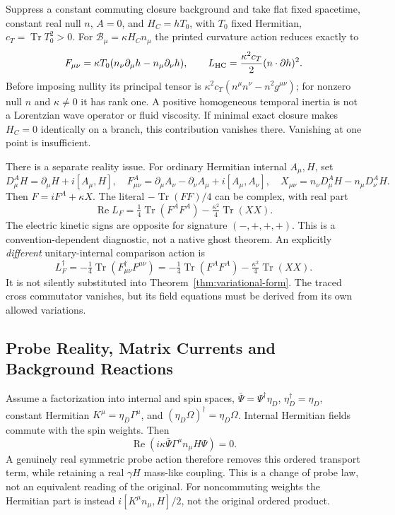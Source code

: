 Suppress a constant commuting closure background and take flat fixed
spacetime, constant real null $n$, $A=0$, and $H_C=hT_0$, with
$T_0$ fixed Hermitian, $c_T=\operatorname{Tr}T_0^2>0$.
For $\mathcal B_\mu=\kappa H_Cn_\mu$ the printed curvature
action reduces exactly to
\[
 F_{\mu\nu}=\kappa T_0(n_\nu\partial_\mu h-n_\mu\partial_\nu h),
 \qquad
 L_{\rm HC}=\frac{\kappa^2c_T}{2}(n\mathbin{\cdot}\partial h)^2.
\]
Before imposing nullity its principal tensor is
$\kappa^2c_T(n^\mu n^\nu-n^2g^{\mu\nu})$; for nonzero null
$n$ and $\kappa\ne0$ it has rank one. A positive homogeneous
temporal inertia is not a Lorentzian wave operator or fluid viscosity.
If minimal exact closure makes $H_C=0$ identically on a branch, this
contribution vanishes there. Vanishing at one point is insufficient.

There is a separate reality issue. For ordinary Hermitian internal
$A_\mu,H$, set
\[
 D_\mu^AH=\partial_\mu H+i[A_\mu,H],\quad
 F^A_{\mu\nu}=\partial_\mu A_\nu-\partial_\nu A_\mu+i[A_\mu,A_\nu],
 \quad X_{\mu\nu}=n_\nu D_\mu^AH-n_\mu D_\nu^AH.
\]
Then $F=iF^A+\kappa X$. The literal $-\operatorname{Tr}(FF)/4$
can be complex, with real part
\[
 \operatorname{Re}L_F=\tfrac14\operatorname{Tr}(F^AF^A)
                         -\tfrac{\kappa^2}4\operatorname{Tr}(XX).
\]
The electric kinetic signs are opposite for signature $(-,+,+,+)$.
This is a convention-dependent diagnostic, not a native ghost theorem.
An explicitly \emph{different} unitary-internal comparison action is
\[
 L_F^\dagger=-\tfrac14\operatorname{Tr}(F_{\mu\nu}^\dagger F^{\mu\nu})
 =-\tfrac14\operatorname{Tr}(F^AF^A)
  -\tfrac{\kappa^2}4\operatorname{Tr}(XX).
\]
It is not silently substituted into Theorem~\ref{thm:variational-form}.
The traced cross commutator vanishes, but its field equations must be
derived from its own allowed variations.

\subsection{Probe Reality, Matrix Currents and Background Reactions}

Assume a factorization into internal and spin spaces,
$\bar\Psi=\Psi^\dagger\eta_D$, $\eta_D^\dagger=\eta_D$, constant Hermitian
$K^\mu=\eta_D\Gamma^\mu$, and
$(\eta_D\Omega)^\dagger=\eta_D\Omega$. Internal Hermitian fields
commute with the spin weights. Then
\[
 \operatorname{Re}(i\kappa\bar\Psi\Gamma^\mu n_\mu H\Psi)=0.
\]
A genuinely real symmetric probe action therefore removes this ordered
transport term, while retaining a real $\gamma H$ mass-like coupling.
This is a change of probe law, not an equivalent reading of the original.
For noncommuting weights the Hermitian part is instead
$i[K^\mu n_\mu,H]/2$, not the original ordered product.

